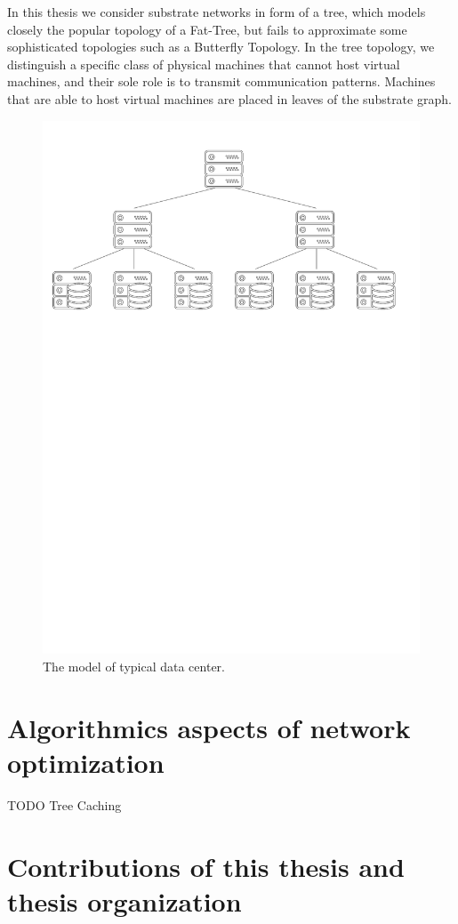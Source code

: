 In this thesis we consider substrate networks in form of a tree, which models closely the popular topology of a Fat-Tree, but fails to approximate some sophisticated topologies such as a Butterfly Topology.
In the tree topology, we distinguish a specific class of physical machines that cannot host virtual machines, and their sole role is to transmit communication patterns.
Machines that are able to host virtual machines are placed in leaves of the substrate graph.


\begin{figure}[t]
\centering
\includegraphics[width=0.79\columnwidth]{figs/tree-topology.pdf}
\caption{The model of typical data center.}\label{fig:overview}
\vspace{-1em}
\end{figure}

\section{Algorithmics aspects of network optimization}

TODO Tree Caching

\section{Contributions of this thesis and thesis organization}

